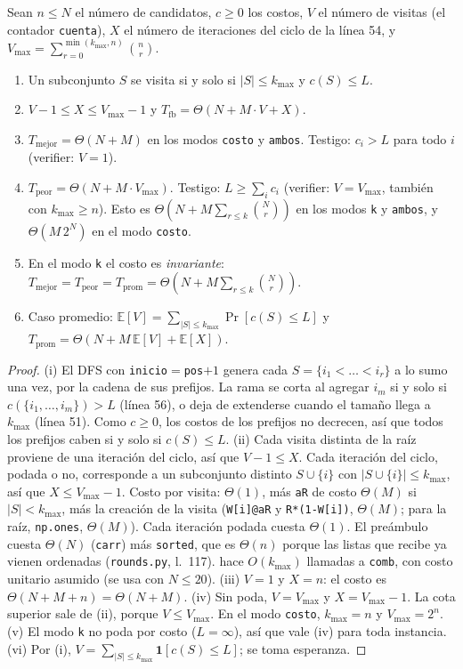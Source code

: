 \begin{proposicion}\label{prop:casos-fb}
Sean $n\le N$ el número de candidatos, $c\ge0$ los costos, $V$ el número de visitas (el contador \texttt{cuenta}), $X$ el número de iteraciones del ciclo de la línea 54, y $V_{\max}=\sum_{r=0}^{\min(k_{\max},n)}\binom nr$.
\begin{enumerate}[label=(\roman*),nosep]
\item Un subconjunto $S$ se visita si y solo si $|S|\le k_{\max}$ y $c(S)\le L$.
\item $V-1\le X\le V_{\max}-1$ y $T_{\text{fb}}=\Theta(N+M\cdot V+X)$.
\item $T_{\text{mejor}}=\Theta(N+M)$ en los modos \texttt{costo} y \texttt{ambos}. Testigo: $c_i>L$ para todo $i$ (verifier: $V=1$).
\item $T_{\text{peor}}=\Theta(N+M\cdot V_{\max})$. Testigo: $L\ge\sum_ic_i$ (verifier: $V=V_{\max}$, también con $k_{\max}\ge n$). Esto es $\Theta(N+M\sum_{r\le k}\binom Nr)$ en los modos \texttt{k} y \texttt{ambos}, y $\Theta(M\,2^N)$ en el modo \texttt{costo}.
\item En el modo \texttt{k} el costo es \emph{invariante}: $T_{\text{mejor}}=T_{\text{peor}}=T_{\text{prom}}=\Theta(N+M\sum_{r\le k}\binom Nr)$.
\item Caso promedio: $\mathbb E[V]=\sum_{|S|\le k_{\max}}\Pr[c(S)\le L]$ y $T_{\text{prom}}=\Theta(N+M\,\mathbb E[V]+\mathbb E[X])$.
\end{enumerate}
\end{proposicion}
\begin{proof}
(i) El DFS con \texttt{inicio}$=$\texttt{pos}$+1$ genera cada $S=\{i_1<\dots<i_r\}$ a lo sumo una vez, por la cadena de sus prefijos. La rama se corta al agregar $i_m$ si y solo si $c(\{i_1,\dots,i_m\})>L$ (línea 56), o deja de extenderse cuando el tamaño llega a $k_{\max}$ (línea 51). Como $c\ge0$, los costos de los prefijos no decrecen, así que todos los prefijos caben si y solo si $c(S)\le L$.
(ii) Cada visita distinta de la raíz proviene de una iteración del ciclo, así que $V-1\le X$. Cada iteración del ciclo, podada o no, corresponde a un subconjunto distinto $S\cup\{i\}$ con $|S\cup\{i\}|\le k_{\max}$, así que $X\le V_{\max}-1$. Costo por visita: $\Theta(1)$, más \texttt{aR} de costo $\Theta(M)$ si $|S|<k_{\max}$, más la creación de la visita (\texttt{W[i]@aR} y \texttt{R*(1-W[i])}, $\Theta(M)$; para la raíz, \texttt{np.ones}, $\Theta(M)$). Cada iteración podada cuesta $\Theta(1)$. El preámbulo cuesta $\Theta(N)$ (\texttt{carr}) más \texttt{sorted}, que es $\Theta(n)$ porque las listas que recibe ya vienen ordenadas (\texttt{rounds.py}, l.~117).  hace $O(k_{\max})$ llamadas a \texttt{comb}, con costo unitario asumido (se usa con $N\le20$).
(iii) $V=1$ y $X=n$: el costo es $\Theta(N+M+n)=\Theta(N+M)$.
(iv) Sin poda, $V=V_{\max}$ y $X=V_{\max}-1$. La cota superior sale de (ii), porque $V\le V_{\max}$. En el modo \texttt{costo}, $k_{\max}=n$ y $V_{\max}=2^n$.
(v) El modo \texttt{k} no poda por costo ($L=\infty$), así que vale (iv) para toda instancia.
(vi) Por (i), $V=\sum_{|S|\le k_{\max}}\mathbf 1[c(S)\le L]$; se toma esperanza.
\end{proof}
